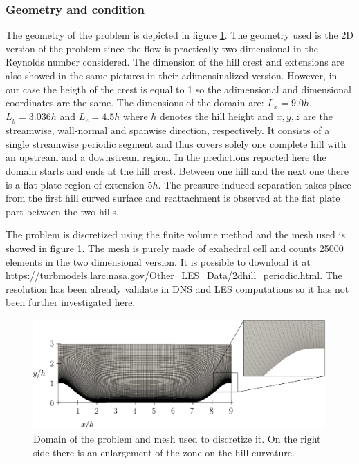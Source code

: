 \subsubsection{Geometry and condition}
The geometry of the problem is depicted in figure \ref{fig:mesh_hill}. The geometry used is the 2D version of the problem since the flow is practically two dimensional in the Reynolds number considered. The dimension of the hill crest and extensions are also showed in the same pictures in their adimensinalized version. However, in our case the heigth of the crest is equal to 1 so the adimensional and dimensional coordinates are the same. The dimensions of the domain are: $L_x = 9.0 h$, $L_y = 3.036 h$ and $L_z = 4.5 h$ where $h$ denotes the hill height and $x,y,z$ are the streamwise, wall-normal and spanwise direction, respectively. It consists of a single streamwise periodic segment and thus covers solely one complete hill with an upstream and a downstream region. In the predictions reported here the domain starts and ends at the hill crest. 
Between one hill and the next one there is a flat plate region of extension $5h$. The pressure induced separation takes place from the first hill curved surface and reattachment is observed at the flat plate part between the two hills.


The problem is discretized using the finite volume method and the mesh used is showed in figure \ref{fig:mesh_hill}. The mesh is purely made of exahedral cell and counts 25000 elements in the two dimensional version. It is possible to download it at \url{https://turbmodels.larc.nasa.gov/Other_LES_Data/2dhill_periodic.html}. The resolution has been already validate in DNS and LES computations so it has not been further investigated here.

\begin{figure}[h]
	\centering
	\includegraphics[width=1\linewidth]{chapter_5/figure/mesh}
	\caption{Domain of the problem and mesh used to discretize it. On the right side there is an enlargement of the zone on the hill curvature.}
	\label{fig:mesh_hill}
\end{figure}


